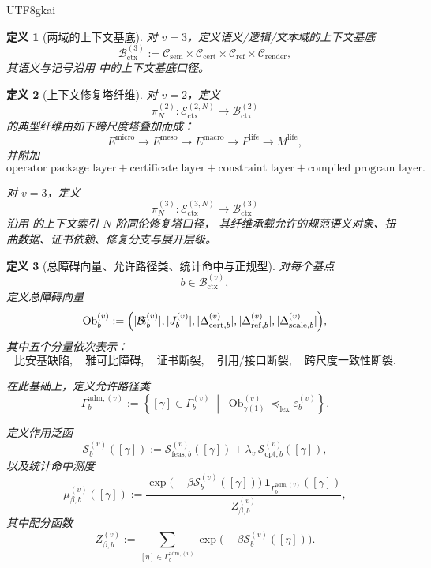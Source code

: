 \documentclass[12pt]{article}
\newtheorem{definition}{定义}[section]
\newcommand{\Ob}{\operatorname{Ob}}
\newcommand{\Bi}{\mathcal{B}\!i}
\begin{document}
\begin{CJK*}{UTF8}{gkai}
\begin{definition}[两域的上下文基底]
对 $v=3$，定义语义/逻辑/文本域的上下文基底
\[
  \mathcal B_{\mathrm{ctx}}^{(3)}
  :=
  \mathcal C_{\mathrm{sem}}
  \times
  \mathcal C_{\mathrm{cert}}
  \times
  \mathcal C_{\mathrm{ref}}
  \times
  \mathcal C_{\mathrm{render}},
\]
其语义与记号沿用 \cite{RepoTex37SemanticGaugeRuntime} 中的上下文基底口径。
\end{definition}

\begin{definition}[上下文修复塔纤维]
\label{def:tex39-fiber}
对 $v=2$，定义
\[
  \pi_N^{(2)}:\mathcal E_{\mathrm{ctx}}^{(2,N)}\to \mathcal B_{\mathrm{ctx}}^{(2)}
\]
的典型纤维由如下跨尺度塔叠加而成：
\[
  E^{\mathrm{micro}}
  \to
  E^{\mathrm{meso}}
  \to
  E^{\mathrm{macro}}
  \to
  P^{\mathrm{life}}
  \to
  M^{\mathrm{life}},
\]
并附加
\[
  \text{operator package layer}
  +
  \text{certificate layer}
  +
  \text{constraint layer}
  +
  \text{compiled program layer}.
\]

对 $v=3$，定义
\[
  \pi_N^{(3)}:\mathcal E_{\mathrm{ctx}}^{(3,N)}\to \mathcal B_{\mathrm{ctx}}^{(3)}
\]
沿用 \cite{RepoTex37SemanticGaugeRuntime} 的上下文索引 $N$ 阶同伦修复塔口径，
其纤维承载允许的规范语义对象、扭曲数据、证书依赖、修复分支与展开层级。
\end{definition}

\begin{definition}[总障碍向量、允许路径类、统计命中与正规型]
\label{def:tex39-obstruction}
对每个基点
\[
  b\in\mathcal B_{\mathrm{ctx}}^{(v)},
\]
定义总障碍向量
\[
  \Ob_b^{(v)}
  :=
  \Bigl(
    |\Bi_b^{(v)}|,
    |J_b^{(v)}|,
    |\Delta_{\mathrm{cert},b}^{(v)}|,
    |\Delta_{\mathrm{ref},b}^{(v)}|,
    |\Delta_{\mathrm{scale},b}^{(v)}|
  \Bigr),
\]
其中五个分量依次表示：
\[
  \text{比安基缺陷},\quad
  \text{雅可比障碍},\quad
  \text{证书断裂},\quad
  \text{引用/接口断裂},\quad
  \text{跨尺度一致性断裂}.
\]

在此基础上，定义允许路径类
\[
  \Gamma_b^{\mathrm{adm},(v)}
  :=
  \left\{
    [\gamma]\in\Gamma_b^{(v)}
    \;\middle|\;
    \Ob_{\gamma(1)}^{(v)}
    \preceq_{\mathrm{lex}}
    \varepsilon_b^{(v)}
  \right\}.
\]

定义作用泛函
\[
  \mathcal S_b^{(v)}([\gamma])
  :=
  \mathcal S_{\mathrm{feas},b}^{(v)}([\gamma])
  +
  \lambda_v\,\mathcal S_{\mathrm{opt},b}^{(v)}([\gamma]),
\]
以及统计命中测度
\[
  \mu_{\beta,b}^{(v)}([\gamma])
  :=
  \frac{
    \exp\!\bigl(-\beta \mathcal S_b^{(v)}([\gamma])\bigr)\,
    \mathbf 1_{\Gamma_b^{\mathrm{adm},(v)}}([\gamma])
  }{
    Z_{\beta,b}^{(v)}
  },
\]
其中配分函数
\[
  Z_{\beta,b}^{(v)}
  :=
  \sum_{[\eta]\in\Gamma_b^{\mathrm{adm},(v)}}
  \exp\!\bigl(-\beta \mathcal S_b^{(v)}([\eta])\bigr).
\]


\end{definition}
\end{CJK*}
\end{document}
